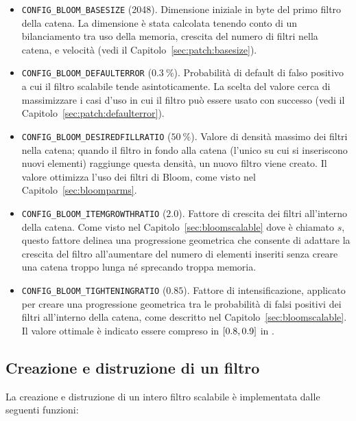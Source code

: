 \medskip
\begin{itemize}
  \item \verb|CONFIG_BLOOM_BASESIZE| (\SI{2048}{\byte}). Dimensione iniziale in byte del primo
  filtro della catena. La dimensione è stata calcolata tenendo conto di un bilanciamento tra uso
  della memoria, crescita del numero di filtri nella catena, e velocità (vedi il
  Capitolo~\ref{sec:patch:basesize}).

  \item \verb|CONFIG_BLOOM_DEFAULTERROR| ($\SI{0.3}{\percent}$). Probabilità di default di falso
  positivo a cui il filtro scalabile tende asintoticamente. La scelta del valore cerca di
  massimizzare i casi d'uso in cui il filtro può essere usato con successo (vedi il
  Capitolo~\ref{sec:patch:defaulterror}).

  \item \verb|CONFIG_BLOOM_DESIREDFILLRATIO| ($\SI{50}{\percent}$). Valore di densità massimo dei filtri
  nella catena; quando il filtro in fondo alla catena (l'unico su cui si inseriscono nuovi elementi)
  raggiunge questa densità, un nuovo filtro viene creato. Il valore ottimizza l'uso dei filtri di
  Bloom, come visto nel Capitolo~\ref{sec:bloomparms}.

  \item \verb|CONFIG_BLOOM_ITEMGROWTHRATIO| ($\num{2.0}$). Fattore di crescita dei filtri
  all'interno della catena. Come visto nel Capitolo~\ref{sec:bloomscalable} dove è chiamato
  $s$, questo fattore delinea una progressione geometrica che consente di adattare la crescita del
  filtro all'aumentare del numero di elementi inseriti senza creare una catena troppo lunga
  né sprecando troppa memoria.

  \item \verb|CONFIG_BLOOM_TIGHTENINGRATIO| ($\num{0.85}$). Fattore di intensificazione, applicato
  per creare una progressione geometrica tra le probabilità di falsi positivi dei filtri all'interno
  della catena, come descritto nel Capitolo~\ref{sec:bloomscalable}. Il valore ottimale è indicato
  essere compreso in $\interval{0.8}{0.9}$ in \cite{bloomscalable}.

\end{itemize}
\medskip

\subsection{Creazione e distruzione di un filtro}

La creazione e distruzione di un intero filtro scalabile è implementata dalle seguenti funzioni:

